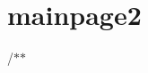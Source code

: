\chapter{mainpage2 }
\hypertarget{md_mainpage2}{}\label{md_mainpage2}
/\texorpdfstring{$\ast$}{*}\texorpdfstring{$\ast$}{*} 